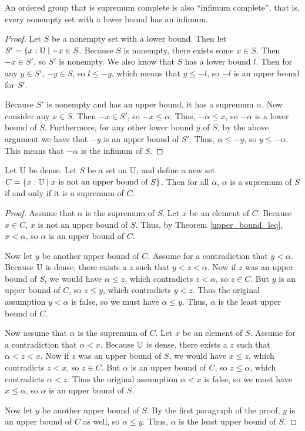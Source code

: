 \documentclass[../../math.tex]{subfiles}
\begin{document}
\begin{theorem}
    An ordered group that is supremum complete is also ``infimum complete'',
    that is, every nonempty set with a lower bound has an infimum.
\end{theorem}
\begin{proof}
    Let $S$ be a nonempty set with a lower bound.  Then let $S' = \{x : \mathbb{U} \mid
    -x \in S$.  Because $S$ is nonempty, there exists some $x \in S$.  Then $-x
    \in S'$, so $S'$ is nonempty.  We also know that $S$ has a lower bound $l$.
    Then for any $y \in S'$, $-y \in S$, so $l \leq -y$, which means that $y
    \leq -l$, so $-l$ is an upper bound for $S'$.

    Because $S'$ is nonempty and has an upper bound, it has a supremum $\alpha$.
    Now consider any $x \in S$.  Then $-x \in S'$, so $-x \leq \alpha$.  Thus,
    $-\alpha \leq x$, so $-\alpha$ is a lower bound of $S$.  Furthermore, for
    any other lower bound $y$ of $S$, by the above argument we have that $-y$ is
    an upper bound of $S'$.  Thus, $\alpha \leq -y$, so $y \leq -\alpha$.  This
    means that $-\alpha$ is the infimum of $S$.
\end{proof}

\begin{theorem}
    Let $\mathbb{U}$ be dense.  Let $S$ be a set on $\mathbb{U}$, and define a new set $C = \{x
    : \mathbb{U} \mid \text{$x$ is not an upper bound of $S$}\}$.  Then for all
    $\alpha$, $\alpha$ is a supremum of $S$ if and only if it is a supremum of
    $C$.
\end{theorem}
\begin{proof}
    Assume that $\alpha$ is the supremum of $S$.  Let $x$ be an element of $C$.
    Because $x \in C$, $x$ is not an upper bound of $S$.  Thus, by Theorem
    \ref{upper_bound_leq}, $x < \alpha$, so $\alpha$ is an upper bound of $C$.

    Now let $y$ be another upper bound of $C$.  Assume for a contradiction that
    $y < \alpha$.  Because $\mathbb{U}$ is dense, there exists a $z$ such that $y < z <
    \alpha$.  Now if $z$ was an upper bound of $S$, we would have $\alpha \leq
    z$, which contradicts $z < \alpha$, so $z \in C$.  But $y$ is an upper bound
    of $C$, so $z \leq y$, which contradicts $y < z$.  Thus the original
    assumption $y < \alpha$ is false, so we must have $\alpha \leq y$.  Thus,
    $\alpha$ is the least upper bound of $C$.

    Now assume that $\alpha$ is the supremum of $C$.  Let $x$ be an element of
    $S$.  Assume for a contradiction that $\alpha < x$.  Because $\mathbb{U}$ is dense,
    there exists a $z$ such that $\alpha < z < x$.  Now if $z$ was an upper
    bound of $S$, we would have $x \leq z$, which contradicts $z < x$, so $z \in
    C$.  But $\alpha$ is an upper bound of $C$, so $z \leq \alpha$, which
    contradicts $\alpha < z$.  Thus the original assumption $\alpha < x$ is
    false, so we must have $x \leq \alpha$, so $\alpha$ is an upper bound of
    $S$.

    Now let $y$ be another upper bound of $S$.  By the first paragraph of the
    proof, $y$ is an upper bound of $C$ as well, so $\alpha \leq y$.  Thus,
    $\alpha$ is the least upper bound of $S$.
\end{proof}
\end{document}
